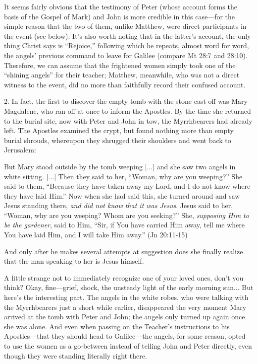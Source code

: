 It seems fairly obvious that the testimony of Peter (whose account forms the basis of the Gospel of Mark) and John is more credible in this case---for the simple reason that the two of them, unlike Matthew, were direct participants in the event (see below). It's also worth noting that in the latter's account, the only thing Christ says is ``Rejoice,'' following which he repeats, almost word for word, the angels' previous command to leave for Galilee (compare Mt 28:7 and 28:10). Therefore, we can assume that the frightened women simply took one of the ``shining angels'' for their teacher; Matthew, meanwhile, who was not a direct witness to the event, did no more than faithfully record their confused account.

2. In fact, the first to discover the empty tomb with the stone cast off was Mary Magdalene, who ran off at once to inform the Apostles. By the time she returned to the burial site, now with Peter and John in tow, the Myrrhbearers had already left. The Apostles examined the crypt, but found nothing more than empty burial shrouds, whereupon they shrugged their shoulders and went back to Jerusalem:

\begin{smallquote}
    But Mary stood outside by the tomb weeping [...] and she saw two angels in white sitting. [...] Then they said to her, ``Woman, why are you weeping?'' She said to them, ``Because they have taken away my Lord, and I do not know where they have laid Him.'' Now when she had said this, she turned around and saw Jesus standing there, \emph{and did not know that it was Jesus}. Jesus said to her, ``Woman, why are you weeping? Whom are you seeking?'' She, \emph{supposing Him to be the gardener}, said to Him, ``Sir, if You have carried Him away, tell me where You have laid Him, and I will take Him away.'' (Jn 20:11-15)
\end{smallquote}
And only after he makes several attempts at suggestion does she finally realize that the man speaking to her is Jesus himself.

A little strange not to immediately recognize one of your loved ones, don't you think? Okay, fine---grief, shock, the unsteady light of the early morning sun... But here's the interesting part. The angels in the white robes, who were talking with the Myrrhbearers just a short while earlier, disappeared the very moment Mary arrived at the tomb with Peter and John; the angels only turned up again once she was alone. And even when passing on the Teacher's instructions to his Apostles---that they should head to Galilee---the angels, for some reason, opted to use the women as a go-between instead of telling John and Peter directly, even though they were standing literally right there.

